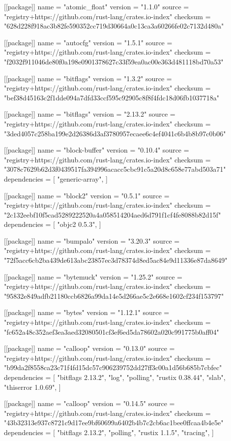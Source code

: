 [[package]]
name = "atomic_float"
version = "1.1.0"
source = "registry+https://github.com/rust-lang/crates.io-index"
checksum = "628d228f918ac3b82fe590352cc719d30664a0c13ca3a60266fe02c7132d480a"

[[package]]
name = "autocfg"
version = "1.5.1"
source = "registry+https://github.com/rust-lang/crates.io-index"
checksum = "f2032f911046de80f0a198e0901378627c33f59ea0ac00e363d481118bd70a53"

[[package]]
name = "bitflags"
version = "1.3.2"
source = "registry+https://github.com/rust-lang/crates.io-index"
checksum = "bef38d45163c2f1dde094a7dfd33ccf595c92905c8f8f4fdc18d06fb1037718a"

[[package]]
name = "bitflags"
version = "2.13.2"
source = "registry+https://github.com/rust-lang/crates.io-index"
checksum = "3ded4057c258ba199e2d26386d3af3780957ecaee6c4ef4041c6b4b8b97c0b06"

[[package]]
name = "block-buffer"
version = "0.10.4"
source = "registry+https://github.com/rust-lang/crates.io-index"
checksum = "3078c7629b62d3f0439517fa394996acacc5cbc91c5a20d8c658e77abd503a71"
dependencies = [
 "generic-array",
]

[[package]]
name = "block2"
version = "0.5.1"
source = "registry+https://github.com/rust-lang/crates.io-index"
checksum = "2c132eebf10f5cad5289222520a4a058514204aed6d791f1cf4fe8088b82d15f"
dependencies = [
 "objc2 0.5.3",
]

[[package]]
name = "bumpalo"
version = "3.20.3"
source = "registry+https://github.com/rust-lang/crates.io-index"
checksum = "72f5acc6cb2ba439de613abc23857ec3d78374d8ed5ac84e9d11336e87da8649"

[[package]]
name = "bytemuck"
version = "1.25.2"
source = "registry+https://github.com/rust-lang/crates.io-index"
checksum = "95832e849adfb21180ccb6826a99da14e5d266ae5c2e668e1602cf234f153797"

[[package]]
name = "bytes"
version = "1.12.1"
source = "registry+https://github.com/rust-lang/crates.io-index"
checksum = "fc652a48c352aef3ea3aed32080501cf3ef6ed5da78602a020c991775b0aff04"

[[package]]
name = "calloop"
version = "0.13.0"
source = "registry+https://github.com/rust-lang/crates.io-index"
checksum = "b99da2f8558ca23c71f4fd15dc57c906239752dd27ff3c00a1d56b685b7cbfec"
dependencies = [
 "bitflags 2.13.2",
 "log",
 "polling",
 "rustix 0.38.44",
 "slab",
 "thiserror 1.0.69",
]

[[package]]
name = "calloop"
version = "0.14.5"
source = "registry+https://github.com/rust-lang/crates.io-index"
checksum = "43b32313e937c8721c9d17ee9bf60699a6402b4b7c2cb6ac1bee0ffcaa4b4e5e"
dependencies = [
 "bitflags 2.13.2",
 "polling",
 "rustix 1.1.5",
 "tracing",
]

